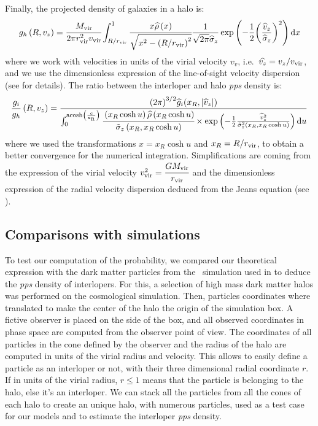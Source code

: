 Finally, the projected density of galaxies in a halo is:
%
\begin{equation}
    g_h \left(R, v_z\right) =\cfrac{M_{\rm vir}}{2\pi r_{\rm vir}^2v_{\rm vir}}
    \int_{R/r_{\rm vir}}^1
    \cfrac{x\widehat\rho \left(x\right)}{\sqrt{x^2 -
    {\left(R/r_{\rm vir}\right)}^2}}\frac{1}{\sqrt{2\pi}\widehat\sigma_z}
    \exp\left(-\frac{1}{2}{\left(\frac{\widehat v_z}{\widehat\sigma_z}\right)}^2\right){\rm{d}} x
\end{equation}
%
where we work with velocities in units of the virial velocity $v_v$, i.e.\
$\widehat{v_z}=v_z/v_{\rm vir}$, and we use the dimensionless expression of the
line-of-sight velocity dispersion (see \bartrefappendix{profiles} for details).
The ratio between the interloper and halo \emph{pps} density is:
%
\begin{equation}
    \label{eq:gi_over_gh}
    \frac{g_i}{g_h}\left(R,v_z\right)=
    \frac{{\left(2\pi\right)}^{3/2}\widehat{g}_i{(x_R,|\widehat{v}_z|)}}
        {\int_0^{\rm{acosh}\left(\frac{c}{x_R}\right)}
            \cfrac{\left(x_R\cosh{u}\right)\widehat\rho\left(x_R\cosh{u}\right)}
            {{\tilde\sigma}_z\left(x_R,x_R\cosh{u}\right)}
    \times\exp\left(-\frac{1}{2}\frac{{\widehat{v}_z}^2}
    {{\tilde\sigma}_z^2\left(x_R,x_R\cosh{u}\right)}\right){\rm{d}} u}
\end{equation}
%
where we used the transformations $x=x_R\cosh u$ and $x_R=R/r_{\rm vir}$, to obtain a
better convergence for the numerical integration. Simplifications are coming
from the expression of the virial velocity $v_{\rm vir}^2=\cfrac{G M_{\rm vir}}{r_{\rm vir}}$
and the dimensionless expression of the radial velocity dispersion deduced from
the Jeans equation (see \bartrefappendix{profiles}).

\subsection{Comparisons with simulations}
\label{sub:comparisons_with_simulations}

To test our computation of the probability, we compared our theoretical
expression with the dark matter particles from the~\cite{Borgani+04} simulation
used in \citet{MBM+10} to deduce the \emph{pps} density of interlopers. For
this, a selection of high mass dark matter halos was performed on the
cosmological simulation. Then, particles coordinates where translated to make
the center of the halo the origin of the simulation box. A fictive observer is
placed on the side of the box, and all observed coordinates in phase space are
computed from the observer point of view. The coordinates of all particles in
the cone defined by the observer and the radius of the halo are computed in
units of the virial radius and velocity. This allows to easily define a
particle as an interloper or not, with their three dimensional radial
coordinate $r$. If in units of the virial radius, $r\leqslant1$ means that the
particle is belonging to the halo, else it's an interloper. We can stack all
the particles from all the cones of each halo to create an unique halo, with
numerous particles, used as a test case for our models and to estimate the
interloper \emph{pps} density.

